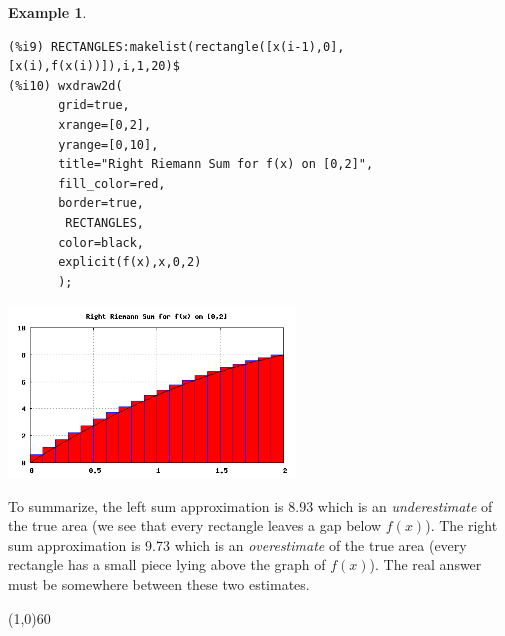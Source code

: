 \documentclass[10.5pt,twoside]{report}
\theoremstyle{definition}
\newtheorem{exmp}{Example}[section]
\begin{document}
\begin{exmp}
\begin{verbatim}
(%i9) RECTANGLES:makelist(rectangle([x(i-1),0],[x(i),f(x(i))]),i,1,20)$
(%i10) wxdraw2d(
       grid=true,
       xrange=[0,2],
       yrange=[0,10],
       title="Right Riemann Sum for f(x) on [0,2]",
       fill_color=red,
       border=true,
        RECTANGLES,
       color=black,
       explicit(f(x),x,0,2)
       );
\end{verbatim}

\includegraphics[width=3in]{example_6_1_1_2}

To summarize, the left sum approximation is 8.93 which is an \textit{underestimate} of the true area (we see that every rectangle leaves a gap below $f(x)$).  The right sum approximation is 9.73 which is an \textit{overestimate} of the true area (every rectangle has a small piece lying above the graph of $f(x)$).  The real answer must be somewhere between these two estimates.

\end{exmp}

\line(1,0){60}
\linethickness{0.5mm}


 
\end{document}
